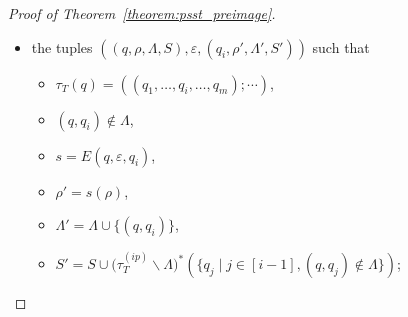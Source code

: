 \begin{proof}[Proof of Theorem~\ref{theorem:psst_preimage}]
\begin{itemize}
\begin{itemize}
\begin{itemize}
\end{itemize}
%
\item the tuples $((q, \rho, \Lambda, S), \varepsilon, (q_i, \rho', \Lambda', S'))$ such that 
\begin{itemize}
%
\item $\tau_T(q) = ((q_1, \ldots, q_i, \ldots, q_m); \cdots)$, 
%
\item $(q, q_i) \not \in \Lambda$,

\item $s = E(q, \varepsilon, q_i)$, 
%
\item $\rho' = s(\rho)$,
%
\item $\Lambda' = \Lambda \cup \{(q, q_i)\}$, 
%
\item $S' =  S \cup \big(\tau^{(ip)}_T \backslash \Lambda \big)^\ast(\{ q_j \mid j \in [i-1], (q, q_j) \not \in \Lambda \})$;
%
\end{itemize}
%


\end{itemize}
\end{itemize}
\end{proof}
